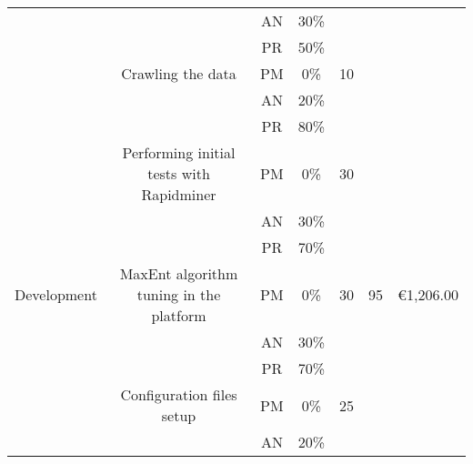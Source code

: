 \begin{table}[p]
\begin{center}
{\begin{tabular}{|c|l|c|c|l|l|l|}
\multicolumn{ 1}{|c|}{} & \multicolumn{ 1}{l|}{} & AN & 30\% & \multicolumn{ 1}{l|}{} & \multicolumn{ 1}{l|}{} & \multicolumn{ 1}{l|}{} \\ \cline{ 3- 4}
\multicolumn{ 1}{|c|}{} & \multicolumn{ 1}{l|}{} & PR & 50\% & \multicolumn{ 1}{l|}{} & \multicolumn{ 1}{l|}{} & \multicolumn{ 1}{l|}{} \\ \cline{ 2- 5}
\multicolumn{ 1}{|c|}{} & \multicolumn{ 1}{c|}{Crawling the data} & PM & 0\% & \multicolumn{ 1}{c|}{10} & \multicolumn{ 1}{l|}{} & \multicolumn{ 1}{l|}{} \\ \cline{ 3- 4}
\multicolumn{ 1}{|c|}{} & \multicolumn{ 1}{l|}{} & AN & 20\% & \multicolumn{ 1}{l|}{} & \multicolumn{ 1}{l|}{} & \multicolumn{ 1}{l|}{} \\ \cline{ 3- 4}
\multicolumn{ 1}{|c|}{} & \multicolumn{ 1}{l|}{} & PR & 80\% & \multicolumn{ 1}{l|}{} & \multicolumn{ 1}{l|}{} & \multicolumn{ 1}{l|}{} \\ \cline{ 2- 5}
\multicolumn{ 1}{|c|}{} & \multicolumn{ 1}{c|}{Performing initial tests with Rapidminer} & PM & 0\% & \multicolumn{ 1}{c|}{30} & \multicolumn{ 1}{l|}{} & \multicolumn{ 1}{l|}{} \\ \cline{ 3- 4}
\multicolumn{ 1}{|c|}{} & \multicolumn{ 1}{l|}{} & AN & 30\% & \multicolumn{ 1}{l|}{} & \multicolumn{ 1}{l|}{} & \multicolumn{ 1}{l|}{} \\ \cline{ 3- 4}
\multicolumn{ 1}{|c|}{} & \multicolumn{ 1}{l|}{} & PR & 70\% & \multicolumn{ 1}{l|}{} & \multicolumn{ 1}{l|}{} & \multicolumn{ 1}{l|}{} \\ \hline
\multicolumn{ 1}{|c|}{Development} & \multicolumn{ 1}{c|}{MaxEnt algorithm tuning in the platform} & PM & 0\% & \multicolumn{ 1}{c|}{30} & \multicolumn{ 1}{c|}{95} & \multicolumn{ 1}{c|}{\textgreek{\euro}1,206.00} \\ \cline{ 3- 4}
\multicolumn{ 1}{|c|}{} & \multicolumn{ 1}{l|}{} & AN & 30\% & \multicolumn{ 1}{l|}{} & \multicolumn{ 1}{l|}{} & \multicolumn{ 1}{l|}{} \\ \cline{ 3- 4}
\multicolumn{ 1}{|c|}{} & \multicolumn{ 1}{l|}{} & PR & 70\% & \multicolumn{ 1}{l|}{} & \multicolumn{ 1}{l|}{} & \multicolumn{ 1}{l|}{} \\ \cline{ 2- 5}
\multicolumn{ 1}{|c|}{} & \multicolumn{ 1}{c|}{Configuration files setup} & PM & 0\% & \multicolumn{ 1}{c|}{25} & \multicolumn{ 1}{l|}{} & \multicolumn{ 1}{l|}{} \\ \cline{ 3- 4}
\multicolumn{ 1}{|c|}{} & \multicolumn{ 1}{l|}{} & AN & 20\% & \multicolumn{ 1}{l|}{} & \multicolumn{ 1}{l|}{} & \multicolumn{ 1}{l|}{} \\ \cline{ 3- 4}

\end{tabular}}
\end{center}
\end{table}

